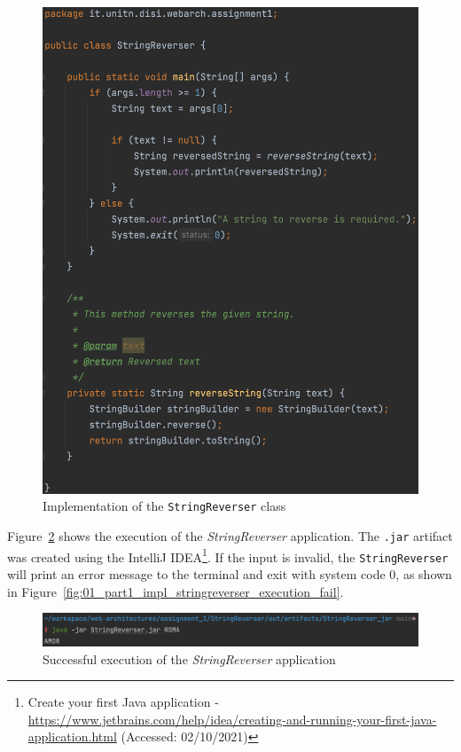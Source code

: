 \documentclass{article}
\def\Fig#1{Figure~\ref{#1}}
\begin{document}
\begin{figure}[h]
\centering
\includegraphics[scale=0.4]{images/StringReverserImpl}
\caption{Implementation of the \texttt{StringReverser} class}
\label{fig:01_part1_impl_stringreverser_implementation}
\end{figure}

\Fig{fig:01_part1_impl_stringreverser_execution} shows the execution of the \textit{StringReverser} application. The \texttt{.jar} artifact was created using the IntelliJ IDEA\footnote{Create your first Java application - \url{https://www.jetbrains.com/help/idea/creating-and-running-your-first-java-application.html} (Accessed: 02/10/2021)}.
If the input is invalid, the \texttt{StringReverser} will print an error message to the terminal and exit with system code 0, as shown in \Fig{fig:01_part1_impl_stringreverser_execution_fail}.

\begin{figure}[h]
\centering
\includegraphics[scale=0.4]{images/StringReverserExec}
\caption{Successful execution of the \textit{StringReverser} application}
\label{fig:01_part1_impl_stringreverser_execution}
\end{figure}
\end{document}
